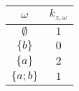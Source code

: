 \begin{frame}[c]
\begin{columns}
\begin{column}{0.6\textwidth}
\end{column}
\begin{column}{0.4\textwidth}

\begin{tabular}{c|c}
  $\omega$ & $k_{z, \omega}$ \\
\hline
  $\emptyset$ & $1$ \\
  $\{b\}$ & $0$ \\
  $\{a\}$ & $2$ \\
  $\{a;b\}$ & $1$
\end{tabular}
\vspace*{1em}

\end{column}
\end{columns}


\end{frame}
